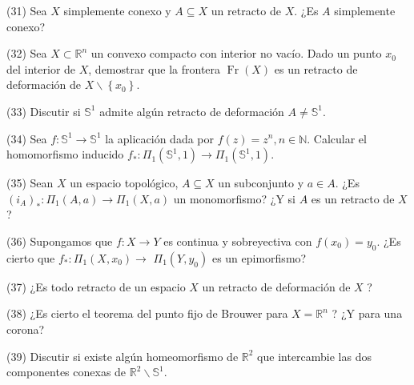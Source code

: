 \documentclass[
  a4paper,
  spanish,
  12pt,
]{scrartcl}
\begin{document}
\begin{ejer}
(31) Sea $X$ simplemente conexo y $A \subseteq X$ un retracto de $X$. ¿Es $A$ simplemente conexo?\\
\end{ejer}

\begin{ejer}
(32) Sea $X \subset \mathbb{R}^{n}$ un convexo compacto con interior no vacío. Dado un punto $x_{0}$ del interior de $X$, demostrar que la frontera $\operatorname{Fr}(X)$ es un retracto de deformación de $X \backslash\left\{x_{0}\right\}$.\\
\end{ejer}

\begin{ejer}
(33) Discutir si $\mathbb{S}^{1}$ admite algún retracto de deformación $A \neq \mathbb{S}^{1}$.\\
\end{ejer}

\begin{ejer}
(34) Sea $f: \mathbb{S}^{1} \rightarrow \mathbb{S}^{1}$ la aplicación dada por $f(z)=z^{n}, n \in \mathbb{N}$. Calcular el homomorfismo inducido $f_{*}: \Pi_{1}\left(\mathbb{S}^{1}, 1\right) \rightarrow \Pi_{1}\left(\mathbb{S}^{1}, 1\right)$.\\
\end{ejer}

\begin{ejer}
(35) Sean $X$ un espacio topológico, $A \subseteq X$ un subconjunto y $a \in A$. ¿Es $\left(i_{A}\right)_{*}: \Pi_{1}(A, a) \rightarrow \Pi_{1}(X, a)$ un monomorfismo? ¿Y si $A$ es un retracto de $X$ ?\\
\end{ejer}

\begin{ejer}
(36) Supongamos que $f: X \rightarrow Y$ es continua y sobreyectiva con $f\left(x_{0}\right)=y_{0}$. ¿Es cierto que $f_{*}: \Pi_{1}\left(X, x_{0}\right) \rightarrow$ $\Pi_{1}\left(Y, y_{0}\right)$ es un epimorfismo?\\
\end{ejer}

\begin{ejer}
(37) ¿Es todo retracto de un espacio $X$ un retracto de deformación de $X$ ?\\
\end{ejer}

\begin{ejer}
(38) ¿Es cierto el teorema del punto fijo de Brouwer para $X=\mathbb{R}^{n}$ ? ¿Y para una corona?\\
\end{ejer}

\begin{ejer}
(39) Discutir si existe algún homeomorfismo de $\mathbb{R}^{2}$ que intercambie las dos componentes conexas de $\mathbb{R}^{2} \backslash \mathbb{S}^{1}$.
\end{ejer}
\end{document}
